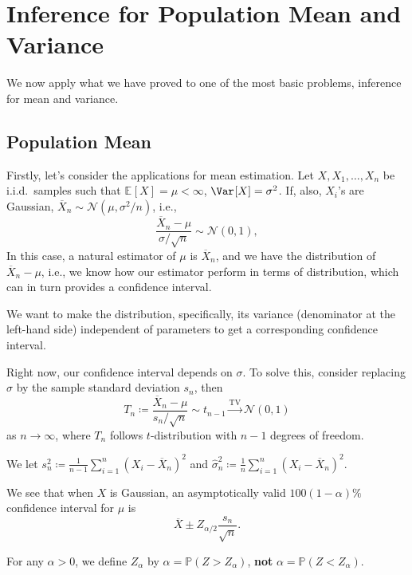 \section{Inference for Population Mean and Variance}
We now apply what we have proved to one of the most basic problems, inference for mean and variance.

\subsection{Population Mean}
Firstly, let's consider the applications for mean estimation. Let \(X, X_1, \dots , X_n\) be i.i.d.\ samples such that \(\mathbb{E}_{}[X] = \mu < \infty \), \(\Var_{}[X] = \sigma ^2\). If, also, \(X_i\)'s are Gaussian, \(\overline{X} _n \sim \mathcal{N} (\mu , \sigma ^2 / n)\), i.e.,
\[
	\frac{\overline{X} _n - \mu }{\sigma / \sqrt{n} } \sim \mathcal{N} (0, 1),
\]
In this case, a natural estimator of \(\mu \) is \(\overline{X} _n\), and we have the distribution of \(\overline{X} _n - \mu \), i.e., we know how our estimator perform in terms of distribution, which can in turn provides a confidence interval.

\begin{intuition}
	We want to make the distribution, specifically, its variance (denominator at the left-hand side) independent of parameters to get a corresponding confidence interval.
\end{intuition}

Right now, our confidence interval depends on \(\sigma \). To solve this, consider replacing \(\sigma \) by the sample standard deviation \(s_n\), then
\[
	T_n \coloneqq \frac{\overline{X} _n - \mu }{s_n / \sqrt{n} } \sim t_{n-1} \overset{\operatorname{TV}}{\to } \mathcal{N} (0, 1)
\]
as \(n \to \infty \), where \(T_n\) follows \(t\)-distribution with \(n-1\) degrees of freedom.

\begin{notation}
	We let \(s_n^2 \coloneqq \frac{1}{n-1} \sum_{i=1}^{n} (X_i - \overline{X} _n)^2\) and \(\hat{\sigma} _n^2 \coloneqq \frac{1}{n} \sum_{i=1}^{n} (X_i - \overline{X} _n)^2\).
\end{notation}

We see that when \(X\) is Gaussian, an asymptotically valid \(100 (1 - \alpha )\%\) confidence interval for \(\mu \) is
\[
	\overline{X} \pm Z_{\alpha / 2} \frac{s_n}{\sqrt{n} }.
\]

\begin{notation}
	For any \(\alpha >0\), we define \(Z_\alpha \) by \(\alpha = \mathbb{P} (Z > Z_\alpha )\), \textbf{not} \(\alpha = \mathbb{P} (Z < Z_\alpha )\).
\end{notation}

